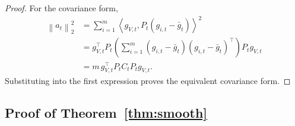 \documentclass{article}
\newcommand{\norm}[1]{\left\lVert #1 \right\rVert}
\newcommand{\inner}[2]{\left\langle #1, #2 \right\rangle}
\begin{document}
\begin{proof}
For the covariance form,
\begin{align}
    \norm{a_t}_2^2
    &=
    \sum_{i=1}^{m}
    \inner{g_{V,t}}{P_t(g_{i,t}-\bar g_t)}^2 \\
    &=
    g_{V,t}^\top P_t
    \left(
    \sum_{i=1}^{m}(g_{i,t}-\bar g_t)(g_{i,t}-\bar g_t)^\top
    \right)
    P_t g_{V,t} \\
    &=
    m\, g_{V,t}^\top P_t C_t P_t g_{V,t}.
\end{align}
Substituting into the first expression proves the equivalent covariance form.
\end{proof}

\subsection{Proof of Theorem~\ref{thm:smooth}}
\end{document}
